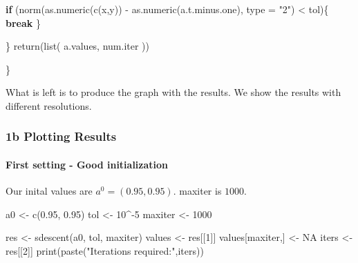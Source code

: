 \documentclass[
]{article}
\newenvironment{Shaded}{\begin{snugshade}}{\end{snugshade}}
\newcommand{\AttributeTok}[1]{\textcolor[rgb]{0.77,0.63,0.00}{#1}}
\newcommand{\ConstantTok}[1]{\textcolor[rgb]{0.00,0.00,0.00}{#1}}
\newcommand{\ControlFlowTok}[1]{\textcolor[rgb]{0.13,0.29,0.53}{\textbf{#1}}}
\newcommand{\DecValTok}[1]{\textcolor[rgb]{0.00,0.00,0.81}{#1}}
\newcommand{\FloatTok}[1]{\textcolor[rgb]{0.00,0.00,0.81}{#1}}
\newcommand{\FunctionTok}[1]{\textcolor[rgb]{0.00,0.00,0.00}{#1}}
\newcommand{\NormalTok}[1]{#1}
\newcommand{\OtherTok}[1]{\textcolor[rgb]{0.56,0.35,0.01}{#1}}
\newcommand{\SpecialCharTok}[1]{\textcolor[rgb]{0.00,0.00,0.00}{#1}}
\newcommand{\StringTok}[1]{\textcolor[rgb]{0.31,0.60,0.02}{#1}}
\begin{document}
\begin{Shaded}
\begin{Highlighting}[]
    
    \ControlFlowTok{if}\NormalTok{ (}\FunctionTok{norm}\NormalTok{(}\FunctionTok{as.numeric}\NormalTok{(}\FunctionTok{c}\NormalTok{(x,y)) }\SpecialCharTok{{-}} \FunctionTok{as.numeric}\NormalTok{(a.t.minus.one), }\AttributeTok{type =} \StringTok{"2"}\NormalTok{) }\SpecialCharTok{\textless{}}\NormalTok{ tol)\{}
      \ControlFlowTok{break}
\NormalTok{    \}}
    
\NormalTok{  \}}
  \FunctionTok{return}\NormalTok{(}\FunctionTok{list}\NormalTok{(}
\NormalTok{    a.values,}
\NormalTok{    num.iter}
\NormalTok{  ))}
  
\NormalTok{\}}
\end{Highlighting}
\end{Shaded}

What is left is to produce the graph with the results. We show the
results with different resolutions.

\hypertarget{b-plotting-results}{%
\subsubsection{1b Plotting Results}\label{b-plotting-results}}

\hypertarget{first-setting---good-initialization}{%
\paragraph{First setting - Good
initialization}\label{first-setting---good-initialization}}

Our inital values are \(a^{0}=(0.95, 0.95)\). maxiter is \(1000\).

\begin{Shaded}
\begin{Highlighting}[]
\NormalTok{a0 }\OtherTok{\textless{}{-}} \FunctionTok{c}\NormalTok{(}\FloatTok{0.95}\NormalTok{, }\FloatTok{0.95}\NormalTok{)}
\NormalTok{tol }\OtherTok{\textless{}{-}} \DecValTok{10}\SpecialCharTok{\^{}{-}}\DecValTok{5}
\NormalTok{maxiter }\OtherTok{\textless{}{-}} \DecValTok{1000}

\NormalTok{res }\OtherTok{\textless{}{-}} \FunctionTok{sdescent}\NormalTok{(a0, tol, maxiter)}
\NormalTok{values }\OtherTok{\textless{}{-}}\NormalTok{ res[[}\DecValTok{1}\NormalTok{]]}
\NormalTok{values[maxiter,] }\OtherTok{\textless{}{-}} \ConstantTok{NA}
\NormalTok{iters }\OtherTok{\textless{}{-}}\NormalTok{ res[[}\DecValTok{2}\NormalTok{]]}
\FunctionTok{print}\NormalTok{(}\FunctionTok{paste}\NormalTok{(}\StringTok{"Iterations required:"}\NormalTok{,iters))}
\end{Highlighting}
\end{Shaded}
\end{document}
